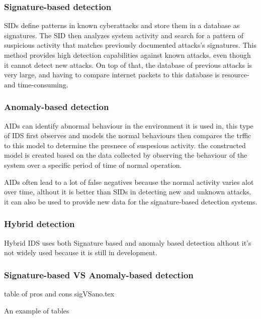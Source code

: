 \subsubsection{Signature-based detection}
SIDs define patterns in known cyberattacks and store them in a database as signatures. The SID then analyzes system activity and search for a pattern of suspicious activity that matches previously documented attacks's signatures. This method provides high detection capabilities against known attacks. even though it cannot detect new attacks. On top of that, the database of previous attacks is very large, and having to compare internet packets to this database is resource- and time-consuming. \cite{NIST-IDS}



\subsubsection{Anomaly-based detection}
AIDs can identify abnormal behaviour in the environment it is used in, this type of IDS first observes and models the normal behaviours then compares the trffic to this model to determine the presnece of suspesious activity. the constructed model is created based on the data collected by observing the behaviour of the system over a specific period of time of normal operation. \cite{NIST-IDS}

AIDs often lead to a lot of false negatives because the normal activity varies alot over time, althout it is better than SIDs in detecting new and unknown attacks. it can also be used to provide new data for the signature-based detection systems. \cite{NIST-IDS}




\subsubsection{Hybrid detection}
Hybrid IDS uses both Signature based and anomaly based detection althout it's not widely used because it is still in development. \cite{NIDS-ip-tcp}
\clearpage

\subsubsection{Signature-based VS Anomaly-based detection}
table of pros and cons
sigVSano.tex
\begin{table}[h]
	\centering
	\caption{An example of tables}
	
	\label{tab:example}
\end{table}


